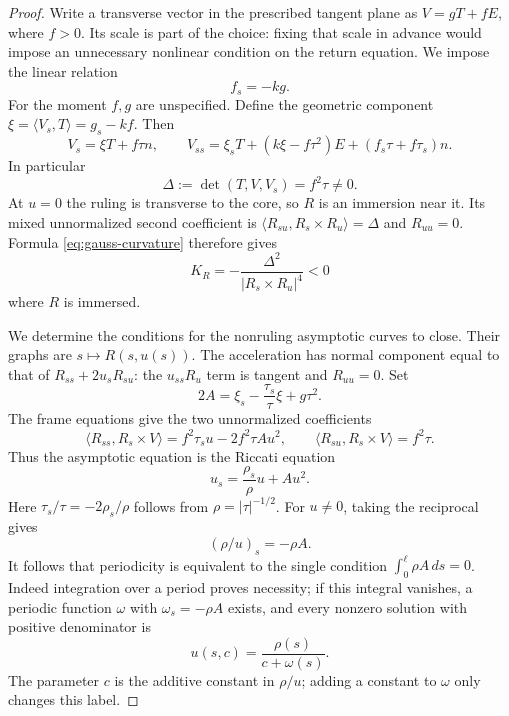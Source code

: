 \documentclass[11pt]{amsart}
\theoremstyle{definition}
\begin{document}
\begin{proof}
Write a transverse vector in the prescribed tangent plane as
$V=gT+fE$, where $f>0$. Its scale is part of the choice: fixing
that scale in advance would impose an unnecessary nonlinear condition
on the return equation. We impose the linear relation
\begin{equation}\label{eq:ruling-constraint}
 f_s=-kg.
\end{equation}
For the moment $f,g$ are unspecified. Define the geometric component
$\xi=\langle V_s,T\rangle=g_s-kf$. Then
\[
 V_s=\xi T+f\tau n,\qquad
 V_{ss}=\xi_sT+(k\xi-f\tau^2)E+(f_s\tau+f\tau_s)n.
\]
In particular
\begin{equation}\label{eq:delta}
 \Delta:=\det(T,V,V_s)=f^2\tau\ne0.
\end{equation}
At $u=0$ the ruling is transverse to the core, so $R$ is an
immersion near it. Its mixed unnormalized second coefficient is
$\langle R_{su},R_s\times R_u\rangle=\Delta$ and $R_{uu}=0$.
Formula \eqref{eq:gauss-curvature} therefore gives
\begin{equation}\label{eq:ruled-curvature}
 K_R=-\frac{\Delta^2}{|R_s\times R_u|^4}<0
\end{equation}
where $R$ is immersed.

We determine the conditions for the nonruling asymptotic curves to
close. Their graphs are $s\mapsto R(s,u(s))$.
The acceleration has normal component equal to that of
$R_{ss}+2u_sR_{su}$: the $u_{ss}R_u$ term is tangent and
$R_{uu}=0$. Set
\[
 2A=\xi_s-\frac{\tau_s}{\tau}\xi+g\tau^2 .
\]
The frame equations give the two unnormalized coefficients
\[
 \langle R_{ss},R_s\times V\rangle
     =f^2\tau_su-2f^2\tau Au^2,\qquad
 \langle R_{su},R_s\times V\rangle=f^2\tau.
\]
Thus the asymptotic equation is the Riccati equation
\begin{equation}\label{eq:riccati}
 u_s=\frac{\rho_s}{\rho}u+Au^2.
\end{equation}
Here $\tau_s/\tau=-2\rho_s/\rho$ follows from
$\rho=|\tau|^{-1/2}$. For $u\ne0$, taking the reciprocal gives
\begin{equation}\label{eq:reciprocal}
 (\rho/u)_s=-\rho A.
\end{equation}
It follows that periodicity is equivalent to the single condition
$\int_0^\ell\rho A\,ds=0$. Indeed integration over a period proves
necessity; if this integral vanishes, a periodic function $\omega$
with $\omega_s=-\rho A$ exists, and every nonzero solution with
positive denominator is
\begin{equation}\label{eq:leaves}
 u(s,c)=\frac{\rho(s)}{c+\omega(s)}.
\end{equation}
The parameter $c$ is the additive constant in $\rho/u$; adding a
constant to $\omega$ only changes this label.


\end{proof}
\end{document}
